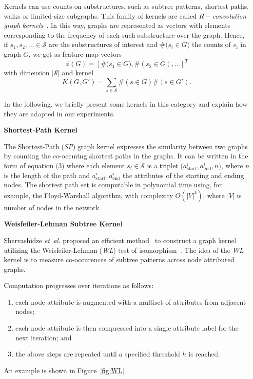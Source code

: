 Kernels can use counts on substructures, such as subtree patterns, shortest paths, walks or limited-size subgraphs.
This family of kernels are called \emph{$R-$convolution graph kernels}~\cite{haussler}.
In this way, graphs are represented as vectors with elements corresponding to the frequency of each such substructure over the graph.
Hence, if
$ s_1, s_2, ... \in \mathcal{S}$ are the substructures of interest and $ \#\big(s_i \in G\big)$ the counts of $ s_i $ in graph $ G $, we get as feature map vectors
\[ 
\phi(G) = \left[\#\big(s_1 \in G\big), \#\left(s_2 \in G\right), \dots\right]^T
\]
with dimension $ |\mathcal{S}| $  and kernel
\[
K(G, G') = \sum_{s \in \mathcal{S}} \#\left(s \in G\right) \#\left(s \in G'\right).
\]

In the following, we briefly present some kernels in this category and explain how they are adapted in our experiments.

\vspace{1em}
\noindent\textbf{Shortest-Path Kernel}

The Shortest-Path (\emph{SP}) graph kernel \cite{borgwardt2005} expresses the similarity between two graphs by counting the co-occuring shortest paths in the graphs.
It can be written in the form of equation (3) where each element $ s_i \in \mathcal{S} $ is a triplet $\big(a_{\text{start}}^i, a_{\text{end}}^i, n\big)$, where $ n $ is the length of the path and $ a_{\text{start}}^i, a_{\text{end}}^i $ the attributes of the starting and ending nodes.
The shortest path set is computable in polynomial time using, for example, the Floyd-Warshall algorithm, with complexity $ O(|V|^4)$, where $ |V| $ is number of nodes in the network.

\vspace{1em}
\noindent\textbf{Weisfeiler-Lehman Subtree Kernel}

Shervashidze \emph{et~al.} proposed an efficient method~\cite{Shervashidze2011} to construct a graph kernel utilizing the \mbox{Weisfeiler-Lehman} (\emph{WL}) test of isomorphism~\cite{weisfeiler1968reduction}.
The idea of the \emph{WL} kernel is to measure co-occurences of subtree patterns across node attributed graphs.

Computation progresses over iterations as follows:
%
\begin{enumerate}
	\item each node attribute is augmented with a multiset of attributes from adjacent nodes;
	\item each node attribute is then compressed into a single attribute label for the next iteration; and
	\item the above steps are repeated until a specified threshold $ h $ is reached.
\end{enumerate}
%
An example is shown in Figure~\ref{fig:WL}.

